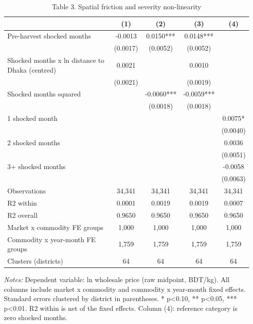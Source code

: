 \begin{table}[htbp]\centering\small
\caption{Table 3. Spatial friction and severity non-linearity}\label{tab:table3_spatial_nonlinearity}
\begin{tabular}{lcccc}
\toprule
 & (1) & (2) & (3) & (4) \\
\midrule
Pre-harvest shocked months & -0.0013 & 0.0150*** & 0.0148*** &  \\
 & (0.0017) & (0.0052) & (0.0052) &  \\
Shocked months x ln distance to Dhaka (centred) & 0.0021 &  & 0.0010 &  \\
 & (0.0021) &  & (0.0019) &  \\
Shocked months squared &  & -0.0060*** & -0.0059*** &  \\
 &  & (0.0018) & (0.0018) &  \\
1 shocked month &  &  &  & 0.0075* \\
 &  &  &  & (0.0040) \\
2 shocked months &  &  &  & 0.0036 \\
 &  &  &  & (0.0051) \\
3+ shocked months &  &  &  & -0.0058 \\
 &  &  &  & (0.0063) \\
\midrule
Observations & 34,341 & 34,341 & 34,341 & 34,341 \\
R2 within & 0.0001 & 0.0019 & 0.0019 & 0.0007 \\
R2 overall & 0.9650 & 0.9650 & 0.9650 & 0.9650 \\
Market x commodity FE groups & 1,000 & 1,000 & 1,000 & 1,000 \\
Commodity x year-month FE groups & 1,759 & 1,759 & 1,759 & 1,759 \\
Clusters (districts) & 64 & 64 & 64 & 64 \\
\bottomrule
\end{tabular}
\begin{minipage}{0.95\linewidth}\footnotesize \textit{Notes:} Dependent variable: ln wholesale price (raw midpoint, BDT/kg). All columns include market x commodity and commodity x year-month fixed effects. Standard errors clustered by district in parentheses. * p<0.10, ** p<0.05, *** p<0.01. R2 within is net of the fixed effects. Column (4): reference category is zero shocked months.\end{minipage}
\end{table}
